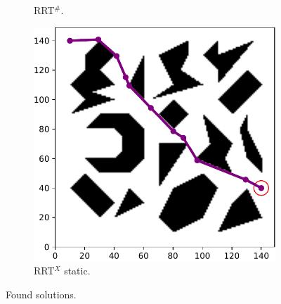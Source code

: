 \documentclass{beamer}
\begin{document}
\begin{frame}
\begin{figure}[!ht]
\begin{subfigure}[t]{0.32\textwidth}
		  \caption{RRT$^\#$.}
		\end{subfigure}  
		\begin{subfigure}[t]{0.32\textwidth}
		  \includegraphics[width=\textwidth]{figChap5/Maze_clutter_final_solution_RRTXstatic.pdf}  
		  \caption{RRT$^X$ static.}
		\end{subfigure}   
		\caption{Found solutions.} 
	  \end{figure}
\end{frame}	
\end{document}
